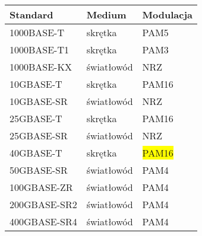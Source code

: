 \begingroup
{}
\begin{table}[h]
\centering
    \begin{tabular}{m{3cm} m{3cm} m{3cm}}
    \toprule
    Standard & Medium & Modulacja \\
    \midrule
    1000BASE-T & skrętka & PAM5 \\
    \midrule
    1000BASE-T1 & skrętka & PAM3 \\
    \midrule
    1000BASE-KX & światłowód & NRZ \\
    \midrule
    10GBASE-T & skrętka & PAM16 \\
    \midrule
    10GBASE-SR & światłowód & NRZ \\
    \midrule
    25GBASE-T & skrętka & PAM16 \\
    \midrule
    25GBASE-SR & światłowód & NRZ \\
    \midrule
    40GBASE-T & skrętka & \colorbox{yellow}{PAM16} \\
    \midrule
    50GBASE-SR & światłowód & PAM4 \\
    \midrule
    100GBASE-ZR & światłowód & PAM4 \\
    \midrule
    200GBASE-SR2 & światłowód & PAM4 \\
    \midrule
    400GBASE-SR4 & światłowód & PAM4 \\
    \bottomrule
    \end{tabular}
\end{table}
\endgroup
